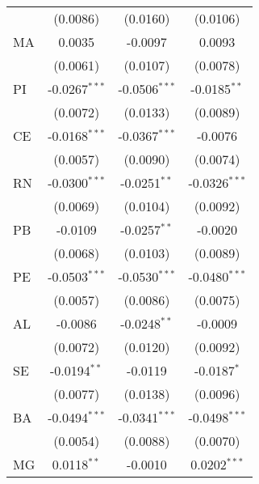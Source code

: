 \begin{tabular}{lccc}
                   & (0.0086)                       & (0.0160)                & (0.0106)\\   
   MA              & 0.0035                         & -0.0097                 & 0.0093\\   
                   & (0.0061)                       & (0.0107)                & (0.0078)\\   
   PI              & -0.0267$^{***}$                & -0.0506$^{***}$         & -0.0185$^{**}$\\   
                   & (0.0072)                       & (0.0133)                & (0.0089)\\   
   CE              & -0.0168$^{***}$                & -0.0367$^{***}$         & -0.0076\\   
                   & (0.0057)                       & (0.0090)                & (0.0074)\\   
   RN              & -0.0300$^{***}$                & -0.0251$^{**}$          & -0.0326$^{***}$\\   
                   & (0.0069)                       & (0.0104)                & (0.0092)\\   
   PB              & -0.0109                        & -0.0257$^{**}$          & -0.0020\\   
                   & (0.0068)                       & (0.0103)                & (0.0089)\\   
   PE              & -0.0503$^{***}$                & -0.0530$^{***}$         & -0.0480$^{***}$\\   
                   & (0.0057)                       & (0.0086)                & (0.0075)\\   
   AL              & -0.0086                        & -0.0248$^{**}$          & -0.0009\\   
                   & (0.0072)                       & (0.0120)                & (0.0092)\\   
   SE              & -0.0194$^{**}$                 & -0.0119                 & -0.0187$^{*}$\\   
                   & (0.0077)                       & (0.0138)                & (0.0096)\\   
   BA              & -0.0494$^{***}$                & -0.0341$^{***}$         & -0.0498$^{***}$\\   
                   & (0.0054)                       & (0.0088)                & (0.0070)\\   
   MG              & 0.0118$^{**}$                  & -0.0010                 & 0.0202$^{***}$\\   

\end{tabular}
